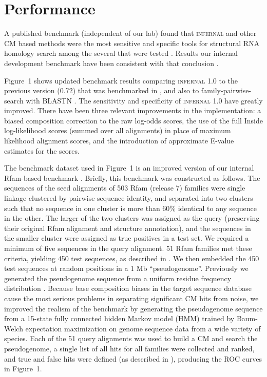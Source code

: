 
\section{Performance}

A published benchmark (independent of our lab) found that
\textsc{infernal} and other CM based methods were the most sensitive
and specific tools for structural RNA homology search among the
several that were tested \citep{Freyhult07}.  Results our internal
development benchmark have been consistent with
that conclusion \citep{NawrockiEddy07}. 

Figure~1 shows updated benchmark results comparing \textsc{infernal}
1.0 to the previous version (0.72) that was benchmarked in
\citep{Freyhult07}, and also to family-pairwise-search with BLASTN
\citep{Altschul97,Grundy98b}.  The sensitivity and specificity of
\textsc{infernal} 1.0 have greatly improved. There have been three
relevant improvements in the implementation: a biased composition
correction to the raw log-odds scores, the use of the full Inside
log-likelihood scores (summed over all alignments) in place of maximum
likelihood alignment scores, and the introduction of approximate
E-value estimates for the scores.

The benchmark dataset used in Figure~1 is an improved version of our
internal Rfam-based benchmark \citep{NawrockiEddy07}. Briefly, this
benchmark was constructed as follows. The sequences of the seed
alignments of 503 Rfam (release 7) families were single linkage
clustered by pairwise sequence identity, and separated into two
clusters such that no sequence in one cluster is more than 60\%
identical to any sequence in the other. The larger of the two clusters
was assigned as the query (preserving their original Rfam alignment
and structure annotation), and the sequences in the smaller cluster
were assigned as true positives in a test set. We required a minimum
of five sequences in the query alignment. 51 Rfam families met these
criteria, yielding 450 test sequences, as described in
\citep{NawrockiEddy07}. We then embedded the 450 test sequences at random
positions in a 1 Mb ``pseudogenome''. Previously we generated the
pseudogenome sequence from a uniform residue frequency distribution
\citep{NawrockiEddy07}. Because base composition biases in the target
sequence database cause the most serious problems in separating
significant CM hits from noise, we improved the realism of the
benchmark by generating the pseudogenome sequence from a 15-state
fully connected hidden Markov model (HMM) trained by Baum-Welch
expectation maximization \citep{Durbin98} on genome sequence data from
a wide variety of species. Each of the 51 query alignments was used to
build a CM and search the pseudogenome, a single list of all hits for
all families were collected and ranked, and true and false hits were
defined (as described in \citep{NawrockiEddy07}), producing the
ROC curves in Figure~1.

